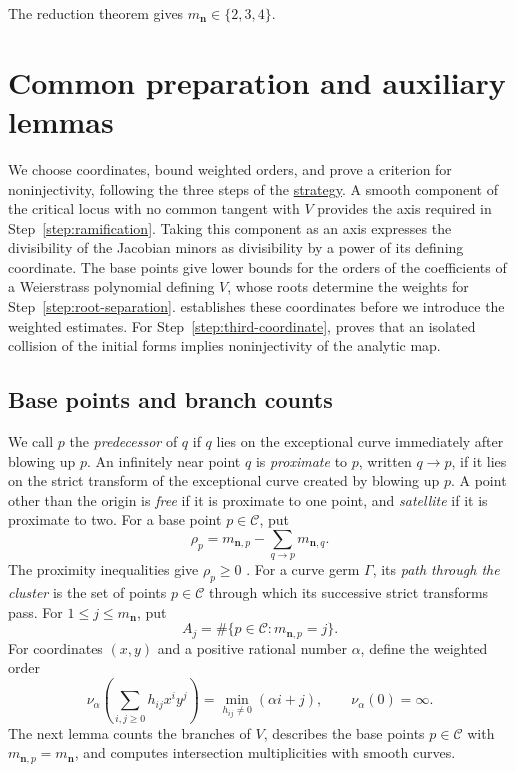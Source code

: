 \documentclass[11pt,letterpaper]{article}
\numberwithin{equation}{section}
\theoremstyle{remark}
\theoremstyle{plain}
\begin{document}
The reduction theorem \cite[Theorem~1.1]{PortillaReduction} gives
$m_{\boldsymbol{n}}\in\{2,3,4\}$.

\section{Common preparation and auxiliary lemmas}
\label{sec:auxiliary}

We choose coordinates, bound weighted orders, and prove a criterion
for noninjectivity, following the three steps of the
\hyperref[sec:strategy]{strategy}.  A smooth component
of the critical locus with no common tangent with $V$ provides the axis
required in Step~\ref{step:ramification}.  Taking this component as an
axis expresses the divisibility of the Jacobian minors as divisibility
by a power of its defining coordinate.  The base points give lower bounds for the orders of the
coefficients of a Weierstrass polynomial defining $V$, whose roots
determine the weights for Step~\ref{step:root-separation}.
 establishes these coordinates before
we introduce the weighted estimates.  For
Step~\ref{step:third-coordinate},  proves that
an isolated collision of the initial forms implies noninjectivity
of the analytic map.

\subsection{Base points and branch counts}

We call $p$ the \emph{predecessor} of $q$ if $q$ lies on the
exceptional curve immediately after blowing up $p$.
An infinitely near point $q$ is \emph{proximate} to $p$, written
$q\to p$, if it lies on the strict transform of the exceptional
curve created by blowing up $p$.  A point other than the origin is \emph{free} if it
is proximate to one point, and \emph{satellite} if it is proximate to two.
For a base point $p\in\mathcal C$, put
\[
 \rho_p=m_{\boldsymbol{n},p}
 -\sum_{q\to p}m_{\boldsymbol{n},q}.
\]
The proximity inequalities give $\rho_p\geq0$
\cite[Corollary~7.2.14]{CasasAlvero}.  For a curve germ $\Gamma$,
its \emph{path through the cluster} is the set of points $p\in\mathcal C$
through which its successive strict transforms pass.  For $1\leq j\leq m_{\boldsymbol n}$, put
\begin{equation}
 A_j=\#\{p\in\mathcal C:m_{\boldsymbol n,p}=j\}.
 \label{eq:base-point-counts}
\end{equation}
For coordinates $(x,y)$ and a positive rational number $\alpha$,
define the weighted order
\[
 \nu_\alpha\left(\sum_{i,j\geq0}h_{ij}x^iy^j\right)
 =\min_{h_{ij}\neq0}(\alpha i+j),\qquad \nu_\alpha(0)=\infty.
\]
The next lemma counts the branches of $V$, describes the base points
$p\in\mathcal C$ with $m_{\boldsymbol n,p}=m_{\boldsymbol n}$, and
computes intersection multiplicities with smooth curves.
\end{document}
